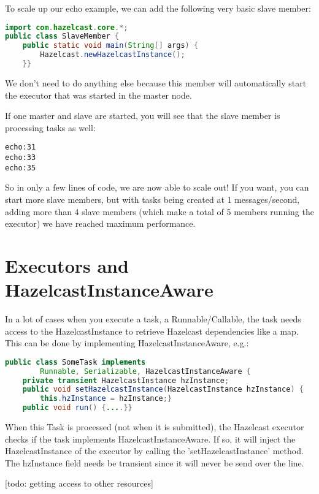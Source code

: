 To scale up our echo example, we can add the following very basic slave member:
\begin{lstlisting}[language=java]
import com.hazelcast.core.*;
public class SlaveMember {
    public static void main(String[] args) {
        Hazelcast.newHazelcastInstance();
    }}
\end{lstlisting}
We don't need to do anything else because this member will automatically start the executor that was started in the master node.

If one master and slave are started, you will see that the slave member is processing tasks as well:
\begin{lstlisting}
echo:31
echo:33
echo:35	
\end{lstlisting}
So in only a few lines of code, we are now able to scale out! If you want, you can start more slave members, but with tasks being created at 1 messages/second, adding more than 4 slave members (which make a total of 5 members running the executor) we have reached maximum performance. 

\section{Executors and HazelcastInstanceAware}
In a lot of cases when you execute a task, a Runnable/Callable, the task needs access to the HazelcastInstance to retrieve Hazelcast dependencies like a map. This can be done by implementing HazelcastInstanceAware, e.g.:
\begin{lstlisting}[language=java]
public class SomeTask implements
        Runnable, Serializable, HazelcastInstanceAware {
    private transient HazelcastInstance hzInstance;
    public void setHazelcastInstance(HazelcastInstance hzInstance) {
        this.hzInstance = hzInstance;}
    public void run() {....}}
\end{lstlisting}
When this Task is processed (not when it is submitted), the Hazelcast executor checks if the task implements HazelcastInstanceAware. If so, it will inject the HazelcastInstance of the executor by calling the 'setHazelcastInstance' method. The hzInstance field needs be transient since it will never be send over the line. 

[todo: getting access to other resources]

